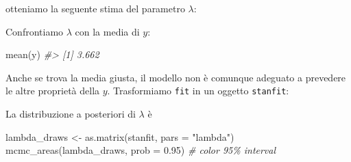 \documentclass[
]{memoir}
\newenvironment{Shaded}{\begin{snugshade}}{\end{snugshade}}
\newcommand{\AttributeTok}[1]{\textcolor[rgb]{0.77,0.63,0.00}{#1}}
\newcommand{\CommentTok}[1]{\textcolor[rgb]{0.56,0.35,0.01}{\textit{#1}}}
\newcommand{\FloatTok}[1]{\textcolor[rgb]{0.00,0.00,0.81}{#1}}
\newcommand{\FunctionTok}[1]{\textcolor[rgb]{0.00,0.00,0.00}{#1}}
\newcommand{\NormalTok}[1]{#1}
\newcommand{\OtherTok}[1]{\textcolor[rgb]{0.56,0.35,0.01}{#1}}
\newcommand{\SpecialCharTok}[1]{\textcolor[rgb]{0.00,0.00,0.00}{#1}}
\newcommand{\StringTok}[1]{\textcolor[rgb]{0.31,0.60,0.02}{#1}}
\theoremstyle{definition}
\theoremstyle{definition}
\theoremstyle{definition}
\theoremstyle{definition}
\theoremstyle{remark}
\begin{document}
\noindent
otteniamo la seguente stima del parametro \(\lambda\):

\begin{Shaded}
\end{Shaded}

\noindent
Confrontiamo \(\lambda\) con la media di \(y\):

\begin{Shaded}
\begin{Highlighting}[]
\FunctionTok{mean}\NormalTok{(y)}
\CommentTok{\#\textgreater{} [1] 3.662}
\end{Highlighting}
\end{Shaded}

Anche se trova la media giusta, il modello non è comunque adeguato a prevedere le altre proprietà della \(y\). Trasformiamo \texttt{fit} in un oggetto \texttt{stanfit}:

\begin{Shaded}
\end{Shaded}

\noindent
La distribuzione a posteriori di \(\lambda\) è

\begin{Shaded}
\begin{Highlighting}[]
\NormalTok{lambda\_draws }\OtherTok{\textless{}{-}} \FunctionTok{as.matrix}\NormalTok{(stanfit, }\AttributeTok{pars =} \StringTok{"lambda"}\NormalTok{)}
\FunctionTok{mcmc\_areas}\NormalTok{(lambda\_draws, }\AttributeTok{prob =} \FloatTok{0.95}\NormalTok{) }\CommentTok{\# color 95\% interval}
\end{Highlighting}
\end{Shaded}
\end{document}
